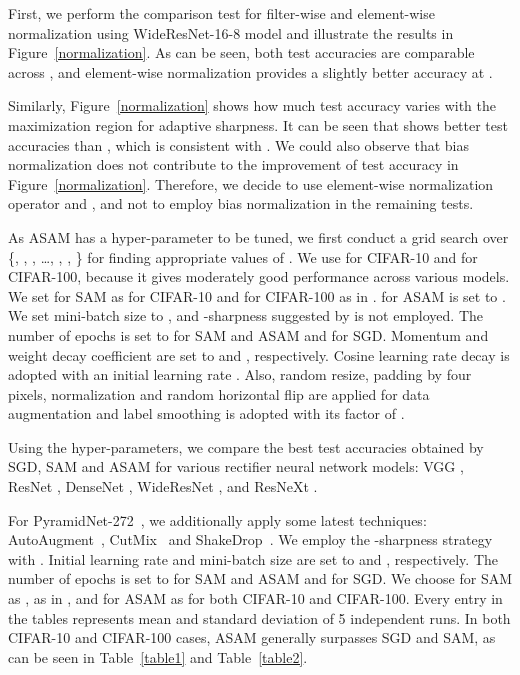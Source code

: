 \documentclass{article}
\begin{document}
First, we perform the comparison test for filter-wise and element-wise normalization using WideResNet-16-8 model \citep{zagoruyko2016wide} and illustrate the results in Figure~\ref{normalization}. As can be seen, both test accuracies are comparable across , and element-wise normalization provides a slightly better accuracy at . 

Similarly, Figure~\ref{normalization} shows how much test accuracy varies with the maximization region for adaptive sharpness. It can be seen that  shows better test accuracies than , which is consistent with \citet{foret2021sharpnessaware}. We could also observe that bias normalization does not contribute to the improvement of test accuracy in Figure~\ref{normalization}. Therefore, we decide to use element-wise normalization operator and , and not to employ bias normalization in the remaining tests.

As ASAM has a hyper-parameter  to be tuned, we first conduct a grid search over \{, , , \ldots, , , \} for finding appropriate values of . We use  for CIFAR-10 and  for CIFAR-100, because it gives moderately good performance across various models. We set  for SAM as  for CIFAR-10 and  for CIFAR-100 as in \citet{foret2021sharpnessaware}.  for ASAM is set to . 
We set mini-batch size to , and -sharpness suggested by \citet{foret2021sharpnessaware} is not employed. The number of epochs is set to  for SAM and ASAM and  for SGD. Momentum and weight decay coefficient are set to  and , respectively. 
Cosine learning rate decay \citep{loshchilov2016sgdr} is adopted with an initial learning rate . Also, random resize, padding by four pixels, normalization and random horizontal flip are applied for data augmentation and label smoothing \citep{NEURIPS2019_f1748d6b} is adopted with its factor of .

Using the hyper-parameters, we compare the best test accuracies obtained by SGD, SAM and ASAM for various rectifier neural network models: VGG \citep{simonyan2014very}, ResNet \citep{he2016deep}, DenseNet \citep{huang2017densely}, WideResNet \citep{zagoruyko2016wide}, and ResNeXt \citep{xie2017aggregated}. 



For PyramidNet-272~\citep{han2017deep}, we additionally apply some latest techniques: AutoAugment~\citep{cubuk2019autoaugment}, CutMix~\citep{yun2019cutmix} and ShakeDrop~\citep{yamada2019shakedrop}. We employ the -sharpness strategy with . Initial learning rate and mini-batch size are set to  and , respectively. The number of epochs is set to  for SAM and ASAM and  for SGD. We choose  for SAM as , as in \citet{foret2021sharpnessaware}, and  for ASAM as  for both CIFAR-10 and CIFAR-100. Every entry in the tables represents mean and standard deviation of 5 independent runs. In both CIFAR-10 and CIFAR-100 cases, ASAM generally surpasses SGD and SAM, as can be seen in Table~\ref{table1} and Table~\ref{table2}.
\end{document}
